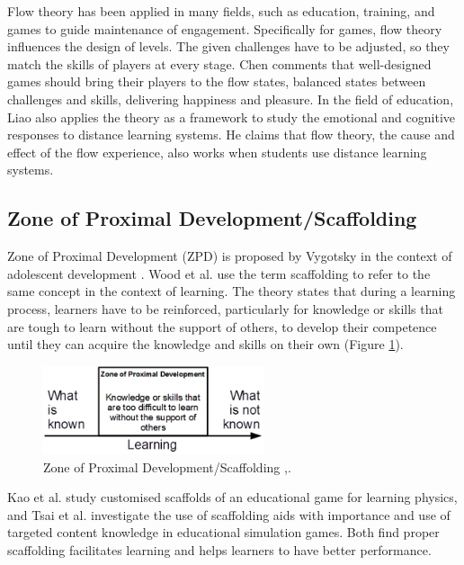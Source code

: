 \documentclass[12pt, a4paper]{report}
\begin{document}
Flow theory has been applied in many fields, such as education, training, and games to guide maintenance of engagement. Specifically for games, flow theory influences the design of levels. The given challenges have to be adjusted, so they match the skills of players at every stage. Chen \cite{chen2007flow} comments that well-designed games should bring their players to the flow states, balanced states between challenges and skills, delivering happiness and pleasure. In the field of education, Liao \cite{liao2006flow} also applies the theory as a framework to study the emotional and cognitive responses to distance learning systems. He claims that flow theory, the cause and effect of the flow experience, also works when students use distance learning systems.

\subsection{Zone of Proximal Development/Scaffolding}
Zone of Proximal Development (ZPD) is proposed by Vygotsky in the context of adolescent development \cite{vygotsky1978mind}. Wood et al. \cite{wood1976role} use the term scaffolding to refer to the same concept in the context of learning. The theory states that during a learning process, learners have to be reinforced, particularly for knowledge or skills that are tough to learn without the support of others, to develop their competence until they can acquire the knowledge and skills on their own (Figure \ref{scaffolding}). 

\begin{figure}[ht]
\centering
\includegraphics[width=6.5cm]{scaffolding}
\caption{Zone of Proximal Development/Scaffolding \cite{vygotsky1978mind},\cite{wood1976role}.}
\label{scaffolding}
\end{figure}

Kao et al. \cite{kao2015designing} study customised scaffolds of an educational game for learning physics, and Tsai et al. \cite{tsai2013importance} investigate the use of scaffolding aids with importance and use of targeted content knowledge in educational simulation games. Both find proper scaffolding facilitates learning and helps learners to have better performance. 
\end{document}
